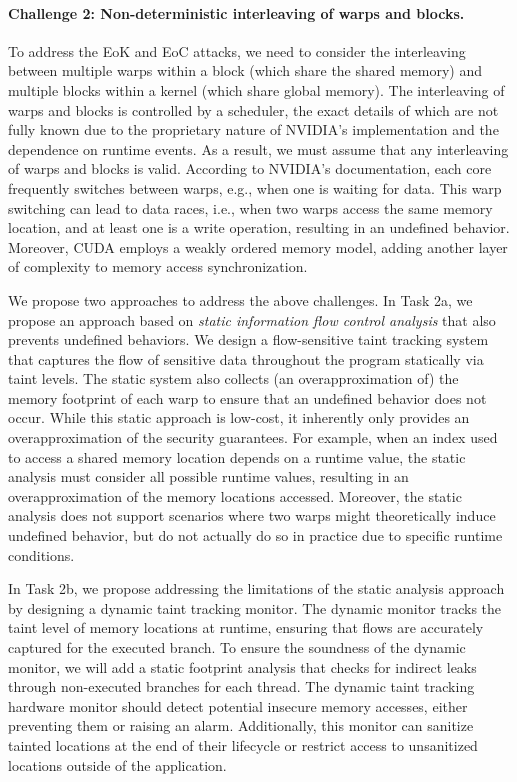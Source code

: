 \paragraph{Challenge 2: Non-deterministic interleaving of warps and blocks.}
To address the EoK and EoC attacks, we need to consider the interleaving between multiple warps within a block (which share the shared memory) and multiple blocks within a kernel (which share global memory).
%
The interleaving of warps and blocks is controlled by a scheduler, the exact details of which are not fully known due to the proprietary nature of NVIDIA's implementation and the dependence on runtime events.
%
As a result, we must assume that any interleaving of warps and blocks is valid. 
% 
According to NVIDIA's documentation, each core frequently switches between warps, e.g., when one is waiting for data. 
%
This warp switching can lead to data races, i.e., when two warps access the same memory location, and at least one is a write operation, resulting in an undefined behavior.
%
Moreover, CUDA employs a weakly ordered memory model, adding another layer of complexity to memory access synchronization.

%
% 


We propose two approaches to address the above challenges.
%
In Task 2a, we propose an approach based on \emph{static information flow control analysis} that also prevents undefined behaviors.
%
We design a flow-sensitive taint tracking system that captures the flow of sensitive data throughout the program statically via taint levels. 
%
The static system also collects (an overapproximation of) the memory footprint of each warp to ensure that an undefined behavior does not occur.
%
While this static approach is low-cost, it inherently only provides an overapproximation of the security guarantees. 
% 
For example, when an index used to access a shared memory location depends on a runtime value, the static analysis must consider all possible runtime values, resulting in an overapproximation of the memory locations accessed.
%
Moreover, the static analysis does not support scenarios where two warps might theoretically induce undefined behavior, but do not actually do so in practice due to specific runtime conditions.

In Task 2b, we propose addressing the limitations of the static analysis approach by designing a dynamic taint tracking monitor.
% 
The dynamic monitor tracks the taint level of memory locations at runtime, ensuring that flows are accurately captured for the executed branch.
%
To ensure the soundness of the dynamic monitor, we will add a static footprint analysis that checks for indirect leaks through non-executed branches for each thread. 
% 
The dynamic taint tracking hardware monitor should detect potential insecure memory accesses, either preventing them or raising an alarm.
% 
Additionally, this monitor can sanitize tainted locations at the end of their lifecycle or restrict access to unsanitized locations outside of the application.

